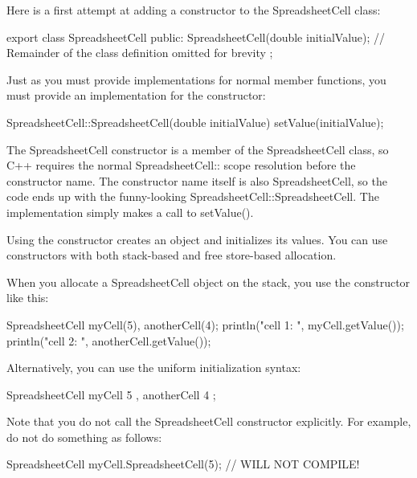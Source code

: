 Here is a first attempt at adding a constructor to the SpreadsheetCell class:

\begin{cpp}
export class SpreadsheetCell
{
    public:
        SpreadsheetCell(double initialValue);
        // Remainder of the class definition omitted for brevity
};
\end{cpp}

Just as you must provide implementations for normal member functions, you must provide an implementation for the constructor:

\begin{cpp}
SpreadsheetCell::SpreadsheetCell(double initialValue)
{
    setValue(initialValue);
}
\end{cpp}

The SpreadsheetCell constructor is a member of the SpreadsheetCell class, so C++ requires the normal SpreadsheetCell:: scope resolution before the constructor name. The constructor name itself is also SpreadsheetCell, so the code ends up with the funny-looking SpreadsheetCell::SpreadsheetCell. The implementation simply makes a call to setValue().


Using the constructor creates an object and initializes its values. You can use constructors with both stack-based and free store-based allocation.


When you allocate a SpreadsheetCell object on the stack, you use the constructor like this:

\begin{cpp}
SpreadsheetCell myCell(5), anotherCell(4);
println("cell 1: {}", myCell.getValue());
println("cell 2: {}", anotherCell.getValue());
\end{cpp}

Alternatively, you can use the uniform initialization syntax:

\begin{cpp}
SpreadsheetCell myCell { 5 }, anotherCell { 4 };
\end{cpp}

Note that you do not call the SpreadsheetCell constructor explicitly. For example, do not do something as follows:

\begin{cpp}
SpreadsheetCell myCell.SpreadsheetCell(5); // WILL NOT COMPILE!
\end{cpp}


